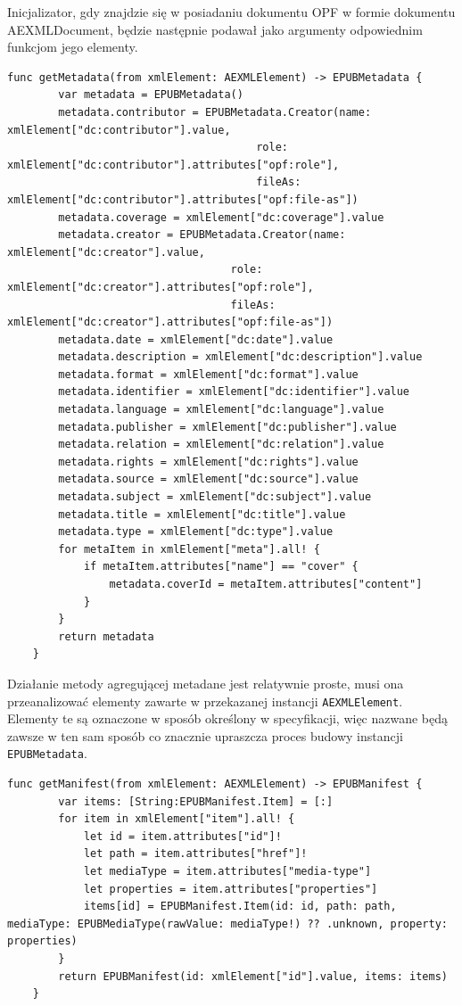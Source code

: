 Inicjalizator, gdy znajdzie się w posiadaniu dokumentu OPF w formie dokumentu AEXMLDocument, będzie następnie podawał jako argumenty odpowiednim funkcjom jego elementy.

\begin{lstlisting}[caption={Implementacja metody \texttt{getMetadata(from xmlElement:)}},language=swift-reference,label=hhhh]
    func getMetadata(from xmlElement: AEXMLElement) -> EPUBMetadata {
        var metadata = EPUBMetadata()
        metadata.contributor = EPUBMetadata.Creator(name: xmlElement["dc:contributor"].value,
                                       role: xmlElement["dc:contributor"].attributes["opf:role"],
                                       fileAs: xmlElement["dc:contributor"].attributes["opf:file-as"])
        metadata.coverage = xmlElement["dc:coverage"].value
        metadata.creator = EPUBMetadata.Creator(name: xmlElement["dc:creator"].value,
                                   role: xmlElement["dc:creator"].attributes["opf:role"],
                                   fileAs: xmlElement["dc:creator"].attributes["opf:file-as"])
        metadata.date = xmlElement["dc:date"].value
        metadata.description = xmlElement["dc:description"].value
        metadata.format = xmlElement["dc:format"].value
        metadata.identifier = xmlElement["dc:identifier"].value
        metadata.language = xmlElement["dc:language"].value
        metadata.publisher = xmlElement["dc:publisher"].value
        metadata.relation = xmlElement["dc:relation"].value
        metadata.rights = xmlElement["dc:rights"].value
        metadata.source = xmlElement["dc:source"].value
        metadata.subject = xmlElement["dc:subject"].value
        metadata.title = xmlElement["dc:title"].value
        metadata.type = xmlElement["dc:type"].value
        for metaItem in xmlElement["meta"].all! {
            if metaItem.attributes["name"] == "cover" {
                metadata.coverId = metaItem.attributes["content"]
            }
        }
        return metadata
    }
\end{lstlisting}

Działanie metody agregującej metadane jest relatywnie proste, musi ona przeanalizować elementy zawarte w przekazanej instancji \texttt{AEXMLElement}. Elementy te są oznaczone w sposób określony w specyfikacji, więc nazwane będą zawsze w ten sam sposób co znacznie upraszcza proces budowy instancji \texttt{EPUBMetadata}.

\begin{lstlisting}[caption={Implementacja metody \texttt{getManifest(from xmlElement:)}},language=swift-reference,label=gggg]
    func getManifest(from xmlElement: AEXMLElement) -> EPUBManifest {
        var items: [String:EPUBManifest.Item] = [:]
        for item in xmlElement["item"].all! {
            let id = item.attributes["id"]!
            let path = item.attributes["href"]!
            let mediaType = item.attributes["media-type"]
            let properties = item.attributes["properties"]
            items[id] = EPUBManifest.Item(id: id, path: path, mediaType: EPUBMediaType(rawValue: mediaType!) ?? .unknown, property: properties)
        }
        return EPUBManifest(id: xmlElement["id"].value, items: items)
    }
\end{lstlisting}

